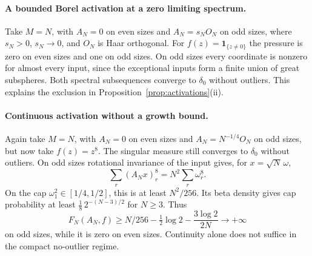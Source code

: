\documentclass[11pt]{article}
\numberwithin{equation}{section}
\theoremstyle{definition}
\newcommand{\one}{\mathbf 1}
\begin{document}
\paragraph{A bounded Borel activation at a zero limiting spectrum.}
Take $M=N$, with $A_N=0$ on even sizes and $A_N=s_NO_N$ on odd sizes, where $s_N>0$, $s_N\to0$, and $O_N$ is Haar orthogonal. For $f(z)=\one_{\{z\ne0\}}$ the pressure is zero on even sizes and one on odd sizes. On odd sizes every coordinate is nonzero for almost every input, since the exceptional inputs form a finite union of great subspheres. Both spectral subsequences converge to $\delta_0$ without outliers. This explains the exclusion in Proposition~\ref{prop:activations}(ii).

\paragraph{Continuous activation without a growth bound.}
Again take $M=N$, with $A_N=0$ on even sizes and $A_N=N^{-1/4}O_N$ on odd sizes, but now take $f(z)=z^8$. The singular measure still converges to $\delta_0$ without outliers. On odd sizes rotational invariance of the input gives, for $x=\sqrt N\,\omega$,
\[
\sum_r(A_Nx)_r^8=N^2\sum_r\omega_r^8.
\]
On the cap $\omega_1^2\in[1/4,1/2]$, this is at least $N^2/256$. Its beta density gives cap probability at least $\frac18\,2^{-(N-3)/2}$ for $N\ge3$. Thus
\[
F_N(A_N,f)\ge N/256-\tfrac12\log2-\frac{3\log2}{2N}\longrightarrow+\infty
\]
on odd sizes, while it is zero on even sizes. Continuity alone does not suffice in the compact no-outlier regime.
\end{document}
